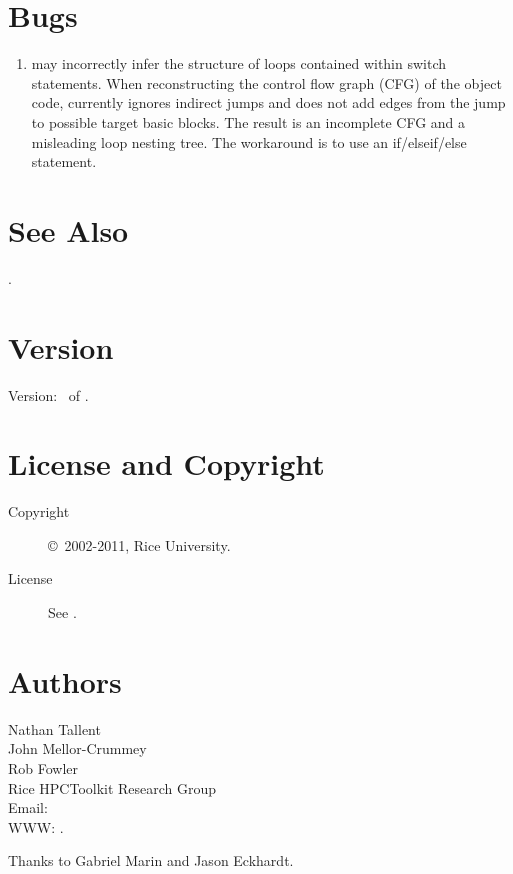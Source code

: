 \documentclass[english]{article}
\begin{document}
\section{Bugs}

\begin{enumerate}

\item {} may incorrectly infer the structure of loops contained within switch statements.
When reconstructing the control flow graph (CFG) of the object code,  currently ignores indirect jumps and does not add edges from the jump to possible target basic blocks.
The result is an incomplete CFG and a misleading loop nesting tree.
The workaround is to use an if/elseif/else statement.

\end{enumerate}

\section{See Also}

.

\section{Version}

Version: \Version\ of \Date.

\section{License and Copyright}

\begin{description}
\item[Copyright] \copyright\ 2002-2011, Rice University.
\item[License] See .
\end{description}

\section{Authors}

\noindent
Nathan Tallent \\
John Mellor-Crummey \\
Rob Fowler \\
Rice HPCToolkit Research Group \\
Email:  \\
WWW: .

Thanks to Gabriel Marin and Jason Eckhardt.

\LatexManEnd
\end{document}
